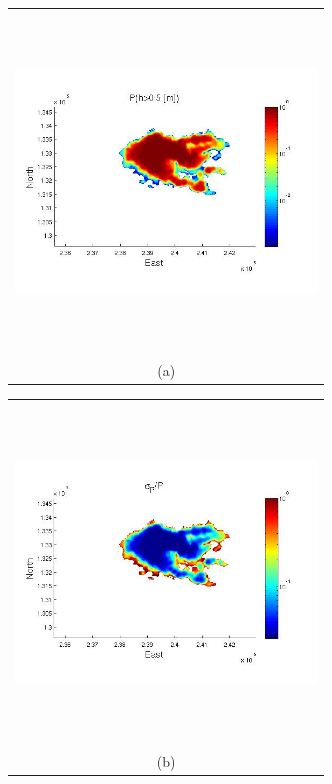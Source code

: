 \documentclass[12pt]{article}
\newcommand{\Pic}[2][0.85]{\begin{center}\texttt{[image: \#2]}
 \end{center} }
\begin{document}
\begin{figure}[H]
      \begin{minipage}[b]{0.6\textwidth}
        \begin{tabular}{c}
       \includegraphics[width=8cm,height=9cm,keepaspectratio]{figs/Galeras_Aster30_P.jpg}\\
        (a)
        \end{tabular}
    \end{minipage}
    \begin{minipage}{0.6\textwidth}
        \begin{tabular}{c}
	\includegraphics[width=8cm,height=9cm,keepaspectratio]{figs/Galeras_Aster30_sigma.jpg}\\
        (b)

\end{tabular}
\end{minipage}
\end{figure}
\end{document}
